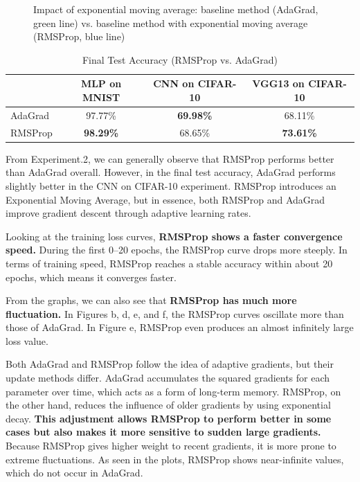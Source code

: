 \documentclass[12pt]{article}
\begin{document}
\begin{figure}[htbp]
    \caption{Impact of exponential moving average: baseline method (AdaGrad, green line) vs. baseline method with exponential moving average (RMSProp, blue line)}
    \label{fig:comprehensive_comparison}
\end{figure}

\begin{table}[H]
\centering
\caption{Final Test Accuracy (RMSProp vs. AdaGrad)}
\label{tab:rmsprop_vs_adagrad}
\begin{tabular}{|l|c|c|c|}
\hline
        & MLP on MNIST & CNN on CIFAR-10 & VGG13 on CIFAR-10 \\ \hline
AdaGrad & 97.77\%      & \textbf{69.98\%}  & 68.11\%           \\ \hline
RMSProp & \textbf{98.29\%} & 68.65\%         & \textbf{73.61\%}    \\ \hline
\end{tabular}
\end{table}

From Experiment.2, we can generally observe that RMSProp performs better than AdaGrad overall. However, in the final test accuracy, AdaGrad performs slightly better in the CNN on CIFAR-10 experiment. RMSProp introduces an Exponential Moving Average, but in essence, both RMSProp and AdaGrad improve gradient descent through adaptive learning rates.

Looking at the training loss curves, \textbf{RMSProp shows a faster convergence speed.} During the first 0–20 epochs, the RMSProp curve drops more steeply. In terms of training speed, RMSProp reaches a stable accuracy within about 20 epochs, which means it converges faster.

From the graphs, we can also see that \textbf{RMSProp has much more fluctuation.} In Figures b, d, e, and f, the RMSProp curves oscillate more than those of AdaGrad. In Figure e, RMSProp even produces an almost infinitely large loss value. 

Both AdaGrad and RMSProp follow the idea of adaptive gradients, but their update methods differ. AdaGrad accumulates the squared gradients for each parameter over time, which acts as a form of long-term memory. RMSProp, on the other hand, reduces the influence of older gradients by using exponential decay. \textbf{This adjustment allows RMSProp to perform better in some cases but also makes it more sensitive to sudden large gradients.} Because RMSProp gives higher weight to recent gradients, it is more prone to extreme fluctuations. As seen in the plots, RMSProp shows near-infinite values, which do not occur in AdaGrad.
\end{document}
